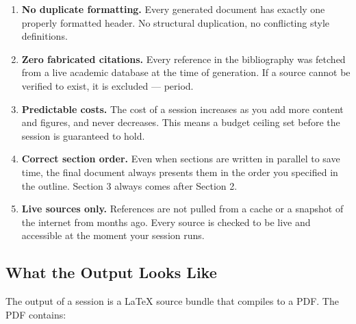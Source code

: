 \begin{keybox}[title=The Five Perricheno Guarantees]
\begin{enumerate}[leftmargin=1.5em]
  \item \textbf{No duplicate formatting.}
        Every generated document has exactly one properly formatted header.
        No structural duplication, no conflicting style definitions.

  \item \textbf{Zero fabricated citations.}
        Every reference in the bibliography was fetched from a live academic database
        at the time of generation.
        If a source cannot be verified to exist, it is excluded — period.

  \item \textbf{Predictable costs.}
        The cost of a session increases as you add more content and figures,
        and never decreases. This means a budget ceiling set before the session
        is guaranteed to hold.

  \item \textbf{Correct section order.}
        Even when sections are written in parallel to save time, the final document
        always presents them in the order you specified in the outline.
        Section 3 always comes after Section 2.

  \item \textbf{Live sources only.}
        References are not pulled from a cache or a snapshot of the internet from
        months ago. Every source is checked to be live and accessible
        at the moment your session runs.
\end{enumerate}
\end{keybox}

\subsection{What the Output Looks Like}

The output of a \sys{} session is a \LaTeX{} source bundle that compiles to a PDF.
The PDF contains:

